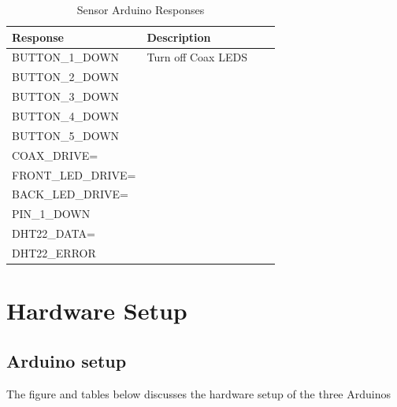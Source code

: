 \documentclass[11pt,fleqn]{book} %
\begin{document}
\begin{table}[h]
\centering
\begin{tabular}{l l p{160pt} p{160pt}}
\toprule
\textbf{Response} & \textbf{Description}\\
\midrule
BUTTON\_1\_DOWN & Turn off Coax LEDS \\
BUTTON\_2\_DOWN &  \\
BUTTON\_3\_DOWN &  \\
BUTTON\_4\_DOWN &  \\
BUTTON\_5\_DOWN &  \\
COAX\_DRIVE=		&	\\
FRONT\_LED\_DRIVE=		&	\\
BACK\_LED\_DRIVE=		&	\\
PIN\_1\_DOWN			&	\\
DHT22\_DATA=			& \\
DHT22\_ERROR & \\


\bottomrule
\end{tabular}
\caption{Sensor Arduino Responses}\label{tab:sac}
\end{table}

\clearpage

\section{Hardware Setup}
\subsection{Arduino setup}
The figure and tables below discusses the hardware setup of the three Arduinos
\end{document}
